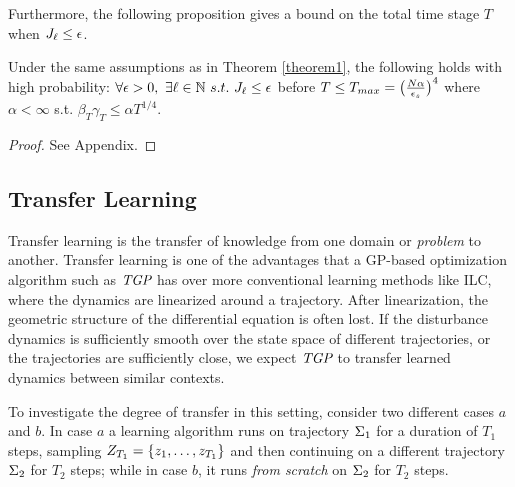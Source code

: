 Furthermore, the following proposition gives a bound on the total time stage $T$ when $J_\ell \leq \epsilon$. \\

\begin{prop}\label{Proposition2}
Under the same assumptions as in Theorem \ref{theorem1}, the following holds with high probability: $\forall \epsilon > 0, \ \exists \episode \in \mathbb{N} \ s.t. \ \ValueFunction_{\episode} \leq \epsilon$ before $T \leq T_{max} = \big(\frac{N\alpha}{\epsilon_s}\big)^{4}$ where $\alpha < \infty$ s.t. $\beta_T\gamma_T \leq \alpha T^{1/4}$.
\end{prop}

\begin{proof}
See Appendix.
\end{proof}


\subsection{Transfer Learning}\label{t-learning}
Transfer learning is the transfer of knowledge from one domain or \emph{problem} to another. Transfer learning is one of the advantages that a GP-based optimization algorithm such as $\emph{TGP}$ has over more conventional learning methods like ILC, where the dynamics are linearized around a trajectory. After linearization, the geometric structure of the differential equation is often lost. If the disturbance dynamics is sufficiently smooth over the state space of different trajectories, or the trajectories are sufficiently close, we expect $\emph{TGP}$ to transfer learned dynamics between similar contexts.

To investigate the degree of transfer in this setting, consider two different cases $a$ and $b$. In case $a$ a learning algorithm runs on trajectory $\Sigma_1$ for a duration of $T_1$ steps, sampling $Z_{T_1} = \{z_1, \ldots, z_{T_1}\}$ and then continuing on a different trajectory $\Sigma_2$ for $T_2$ steps; while in case $b$, it runs \emph{from scratch} on $\Sigma_2$ for $T_2$ steps. 

